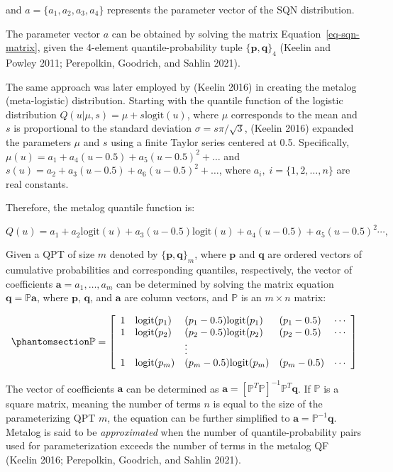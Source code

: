 \documentclass[
]{interact}
\begin{document}
and \(a=\{a_1, a_2, a_3, a_4\}\) represents the parameter vector of the
SQN distribution.

The parameter vector \(a\) can be obtained by solving the matrix
Equation~\ref{eq-sqn-matrix}, given the 4-element quantile-probability
tuple \(\{\mathbf{p}, \mathbf{q}\}_4\) (Keelin and Powley 2011;
Perepolkin, Goodrich, and Sahlin 2021).

The same approach was later employed by (Keelin 2016) in creating the
metalog (meta-logistic) distribution. Starting with the quantile
function of the logistic distribution
\(Q(u\vert\mu,s)=\mu+s\text{logit}(u)\), where \(\mu\) corresponds to
the mean and \(s\) is proportional to the standard deviation
\(\sigma=s\pi/\sqrt3\), (Keelin 2016) expanded the parameters \(\mu\)
and \(s\) using a finite Taylor series centered at 0.5. Specifically,
\(\mu(u)=a_1+a_4(u-0.5)+a_5(u-0.5)^2+\dots\) and
\(s(u)=a_2+a_3(u-0.5)+a_6(u-0.5)^2+\dots\), where
\(a_i, \; i = \{1,2,\dots,n\}\) are real constants.

Therefore, the metalog quantile function is:

\[
Q(u)= a_1+a_2\text{logit}(u)+a_3(u-0.5)\text{logit}(u)+a_4(u-0.5)+a_5(u-0.5)^2\cdots,
\]

Given a QPT of size \(m\) denoted by \(\{\mathbf{p}, \mathbf{q}\}_m\),
where \(\mathbf{p}\) and \(\mathbf{q}\) are ordered vectors of
cumulative probabilities and corresponding quantiles, respectively, the
vector of coefficients \(\mathbf{a}={a_1,\dots,a_m}\) can be determined
by solving the matrix equation \(\mathbf{q}=\mathbb{P}\mathbf{a}\),
where \(\mathbf{p}\), \(\mathbf{q}\), and \(\mathbf{a}\) are column
vectors, and \(\mathbb{P}\) is an \(m \times n\) matrix:

\begin{equation}\phantomsection\label{eq-metalogPMatrixeq}{
\begin{gathered}
\mathbb{P} = \left[\begin{array}{lllll}
1  &\text{logit}(p_1) &(p_1-0.5)\text{logit}(p_1) &(p_1-0.5) &\cdots\\
1  &\text{logit}(p_2) &(p_2-0.5)\text{logit}(p_2) &(p_2-0.5) &\cdots\\
   &                  &\vdots\\
1  &\text{logit}(p_m) &(p_m-0.5)\text{logit}(p_m) &(p_m-0.5) &\cdots
\end{array}\right]
\end{gathered}
}\end{equation}

The vector of coefficients \(\mathbf{a}\) can be determined as
\(\mathbf{a}=[\mathbb{P}^{T}\mathbb{P}]^{-1}\mathbb{P}^{T}\mathbf{q}\).
If \(\mathbb{P}\) is a square matrix, meaning the number of terms \(n\)
is equal to the size of the parameterizing QPT \(m\), the equation can
be further simplified to \(\mathbf{a}=\mathbb{P}^{-1}\mathbf{q}\).
Metalog is said to be \emph{approximated} when the number of
quantile-probability pairs used for parameterization exceeds the number
of terms in the metalog QF (Keelin 2016; Perepolkin, Goodrich, and
Sahlin 2021).
\end{document}
